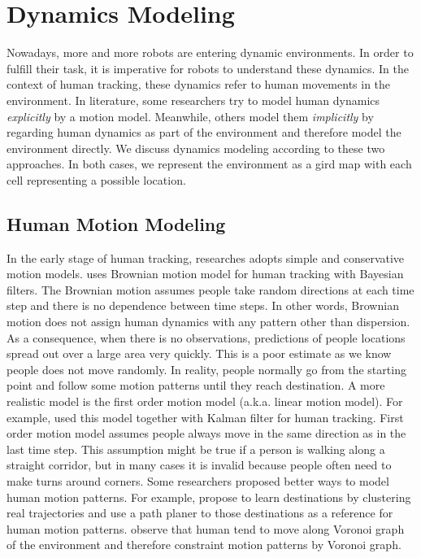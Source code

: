 \section{Dynamics Modeling} \label{lr:dynamic}

Nowadays, more and more robots are entering dynamic environments. In order to fulfill their task, it is imperative for robots to understand these dynamics. In the context of human tracking, these dynamics refer to human movements in the environment. In literature, some researchers try to model human dynamics \textit{explicitly} by a motion model. Meanwhile, others model them \textit{implicitly} by regarding human dynamics as part of the environment and therefore model the environment directly. We discuss dynamics modeling according to these two approaches. In both cases, we represent the environment as a gird map with each cell representing a possible location. 

\subsection{Human Motion Modeling}

In the early stage of human tracking, researches adopts simple and conservative motion models. \citet{montemerlo2002conditional} uses Brownian motion model for human tracking with Bayesian filters.  The Brownian motion assumes people take random directions at each time step and there is no dependence between time steps. In other words, Brownian motion does not assign human dynamics with any pattern other than dispersion. As a consequence, when there is no observations, predictions of people locations spread out over a large area very quickly. This is a poor estimate as we know people does not move randomly. In reality, people normally go from the starting point and follow some motion patterns until they reach destination. A more realistic model is the first order motion model (a.k.a. linear motion model). For example, \citet{meier1999using} used this model together with Kalman filter for human tracking. First order motion model assumes people always move in the same direction as in the last time step. This assumption might be true if a person is walking along a straight corridor, but in many cases it is invalid because people often need to make turns around corners. Some researchers proposed better ways to model human motion patterns. For example, \citet{bruce2004better} propose to learn destinations by clustering real trajectories and use a path planer to those destinations as a reference for human motion patterns. \citet{liao2003voronoi} observe that human tend to move along Voronoi graph of the environment and therefore constraint motion patterns by Voronoi graph. 

